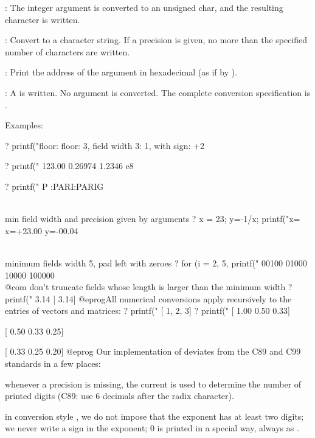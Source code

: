 {\item {}: The integer argument is converted to an unsigned char, and the
resulting character is written.

\item {}: Convert to a character string. If a precision is given, no
more than the specified number of characters are written.

\item {}: Print the address of the argument in hexadecimal (as if by
).

\item \kbd{\%}: A \kbd{\%} is written. No argument is converted. The complete
conversion specification is \kbd{\%\%}.

\noindent Examples:

\bprog
? printf("floor: %
floor: 3, field width 3:   1, with sign:  +2

? printf("%
123.00 0.26974 1.2346 e8

? printf("%
P :PARI:PARIG

\\ min field width and precision given by arguments
? x = 23; y=-1/x; printf("x=%
x=+23.00 y=-00.04

\\ minimum fields width 5, pad left with zeroes
? for (i = 2, 5, printf("%
00100
01000
10000
100000  \\@com don't truncate fields whose length is larger than the minimum width
? printf("%
3.14  |  3.14|
@eprog\noindent All numerical conversions apply recursively to the entries
of vectors and matrices:
\bprog
? printf("%
[   1,   2,   3]
? printf("%
[ 1.00  0.50  0.33]

[ 0.50  0.33  0.25]

[ 0.33  0.25  0.20]
@eprog
 Our implementation of 
deviates from the C89 and C99 standards in a few places:

\item whenever a precision is missing, the current  is
used to determine the number of printed digits (C89: use 6 decimals after
the radix character).

\item in conversion style , we do not impose that the
exponent has at least two digits; we never write a \kbd{+} sign in the
exponent; 0 is printed in a special way, always as .

}

